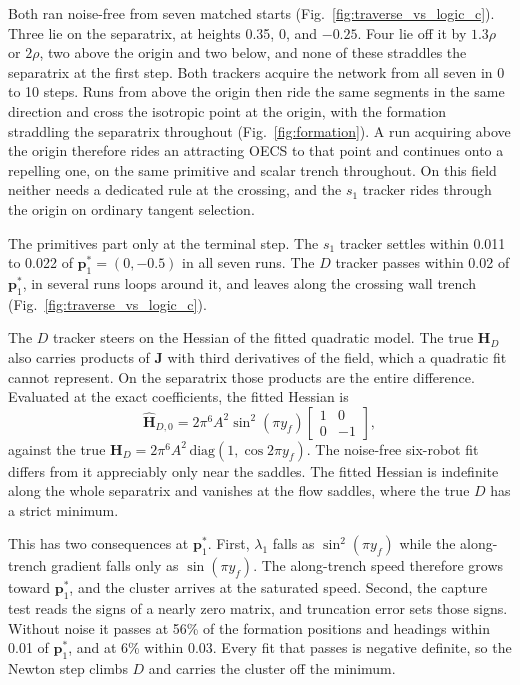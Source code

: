 \documentclass[lettersize,journal]{IEEEtran}
\begin{document}
Both ran noise-free from seven matched starts
(Fig.~\ref{fig:traverse_vs_logic_c}). Three lie on the separatrix, at heights 0.35, 0, and $-0.25$. Four lie off it by $1.3\rho$ or $2\rho$, two above the origin and two below, and none of these straddles the separatrix at the first step. Both trackers acquire the network from all seven in 0 to 10 steps. Runs from above the origin then ride the same segments in the same direction and cross the isotropic point at the origin, with the formation straddling the separatrix throughout (Fig.~\ref{fig:formation}). A run
acquiring above the origin therefore rides an attracting OECS to that
point and continues onto a repelling one, on the same primitive and scalar
trench throughout. On this field neither needs a dedicated rule at the
crossing, and the $s_1$ tracker rides through the origin on ordinary
tangent selection.

The primitives part only at the terminal step. The $s_1$ tracker settles
within 0.011 to 0.022 of $\mathbf{p}^*_1 = (0, -0.5)$ in all seven runs.
The $D$ tracker passes within 0.02 of $\mathbf{p}^*_1$, in several runs
loops around it, and leaves along the crossing wall trench
(Fig.~\ref{fig:traverse_vs_logic_c}).

The $D$ tracker steers on the Hessian of the fitted quadratic model. The
true $\mathbf{H}_D$ also carries products of $\mathbf{J}$ with third
derivatives of the field, which a quadratic fit cannot represent. On the
separatrix those products are the entire difference. Evaluated at the exact
coefficients, the fitted Hessian is
\begin{equation}
    \hat{\mathbf{H}}_{D,0} = 2\pi^6 A^2 \sin^2(\pi y_f)
    \begin{bmatrix} 1 & 0 \\ 0 & -1 \end{bmatrix},
    \label{eq:hess_fit_sep}
\end{equation}
against the true $\mathbf{H}_D = 2\pi^6 A^2\,\mathrm{diag}(1, \cos 2\pi y_f)$.
The noise-free six-robot fit differs from it
appreciably only near the saddles. The fitted Hessian is indefinite along
the whole separatrix and vanishes at the flow saddles, where the true $D$
has a strict minimum.

This has two consequences at $\mathbf{p}^*_1$. First, $\lambda_1$ falls as
$\sin^2(\pi y_f)$ while the along-trench gradient falls only as
$\sin(\pi y_f)$. The along-trench speed therefore grows
toward $\mathbf{p}^*_1$, and the cluster arrives at the saturated speed.
Second, the capture test reads the signs of a nearly zero matrix, and
truncation error sets those signs. Without noise it passes at 56\% of the
formation positions and headings within 0.01 of $\mathbf{p}^*_1$, and at
6\% within 0.03. Every fit that passes is negative definite, so the Newton
step climbs $D$ and carries the cluster off the minimum.
\end{document}
